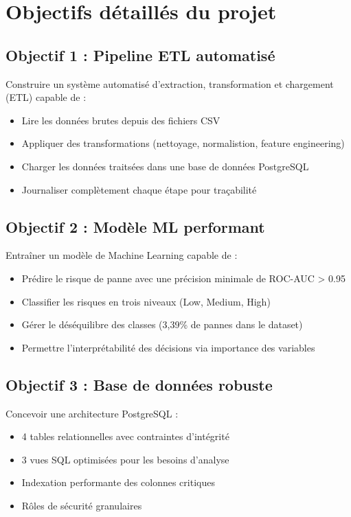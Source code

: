 \documentclass[a4paper,12pt,twoside]{report}
\begin{document}
\section{Objectifs détaillés du projet}

\subsection{Objectif 1 : Pipeline ETL automatisé}

Construire un système automatisé d'extraction, transformation et chargement (ETL) capable de :
\begin{itemize}
    \item Lire les données brutes depuis des fichiers CSV
    \item Appliquer des transformations (nettoyage, normalistion, feature engineering)
    \item Charger les données traitsées dans une base de données PostgreSQL
    \item Journaliser complètement chaque étape pour traçabilité
\end{itemize}

\subsection{Objectif 2 : Modèle ML performant}

Entraîner un modèle de Machine Learning capable de :
\begin{itemize}
    \item Prédire le risque de panne avec une précision minimale de ROC-AUC > 0.95
    \item Classifier les risques en trois niveaux (Low, Medium, High)
    \item Gérer le déséquilibre des classes (3,39\% de pannes dans le dataset)
    \item Permettre l'interprétabilité des décisions via importance des variables
\end{itemize}

\subsection{Objectif 3 : Base de données robuste}

Concevoir une architecture PostgreSQL :
\begin{itemize}
    \item 4 tables relationnelles avec contraintes d'intégrité
    \item 3 vues SQL optimisées pour les besoins d'analyse
    \item Indexation performante des colonnes critiques
    \item Rôles de sécurité granulaires
\end{itemize}
\end{document}
